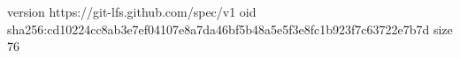version https://git-lfs.github.com/spec/v1
oid sha256:cd10224cc8ab3e7ef04107e8a7da46bf5b48a5e5f3e8fc1b923f7c63722e7b7d
size 76
